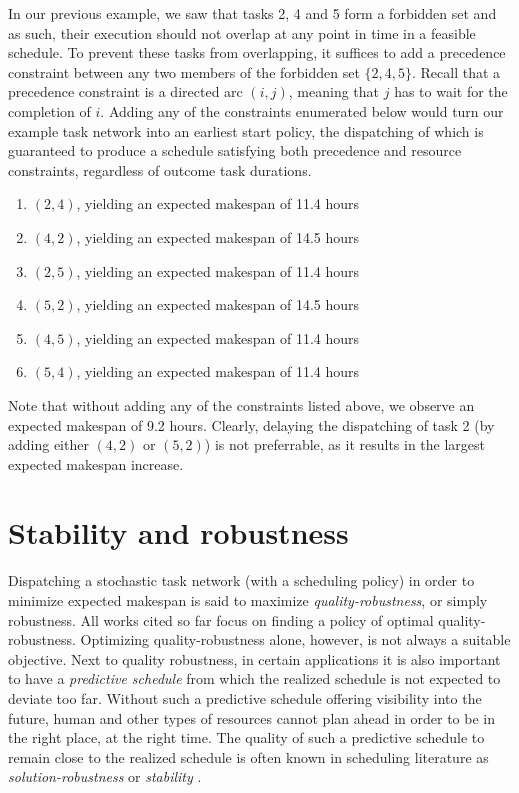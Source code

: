 	\begin{example}
		In our previous example, we saw that tasks 2, 4 and 5 form a forbidden set and as such,
		their execution should not overlap at any point in time in a feasible schedule.
		To prevent these tasks from overlapping, 
		it suffices to add a precedence constraint between any two members of the forbidden set $\{2,4,5\}$.
		Recall that a precedence constraint is a directed arc $(i, j)$, meaning that $j$ has to wait for the completion of $i$.
		Adding any of the constraints enumerated below would turn our example task network into an earliest start policy,
		the dispatching of which is guaranteed to produce a schedule satisfying both precedence and resource constraints, regardless of outcome task durations.
		\begin{enumerate}
			\item $(2,4)$, yielding an expected makespan of 11.4 hours
			\item $(4,2)$, yielding an expected makespan of 14.5 hours
			\item $(2,5)$, yielding an expected makespan of 11.4 hours
			\item $(5,2)$, yielding an expected makespan of 14.5 hours
			\item $(4,5)$, yielding an expected makespan of 11.4 hours
			\item $(5,4)$, yielding an expected makespan of 11.4 hours
		\end{enumerate}
		Note that without adding any of the constraints listed above, we observe an expected makespan of 9.2 hours.
		Clearly, delaying the dispatching of task 2 (by adding either $(4,2)$ or $(5,2)$) is not preferrable, 
		as it results in the largest expected makespan increase.
	\end{example}

\section{Stability and robustness}
\label{chapter:prelim-2:stability}
	Dispatching a stochastic task network (with a scheduling policy) in order to minimize expected makespan 
	is said to maximize \emph{quality-robustness}, or simply robustness.
	All works cited so far focus on finding a policy of optimal quality-robustness.
	Optimizing quality-robustness alone, however, is not always a suitable objective.
	Next to quality robustness,
	in certain applications it is also important to have a \emph{predictive schedule} 
	from which the realized schedule is not expected to deviate too far.
	Without such a predictive schedule offering visibility into the future,
	human and other types of resources cannot plan ahead in order to be in the right place, at the right time.
	The quality of such a predictive schedule to remain close to the realized schedule
	is often known in scheduling literature as \emph{solution-robustness} or \emph{stability} \cite{bidot2009, van2006trade}.

